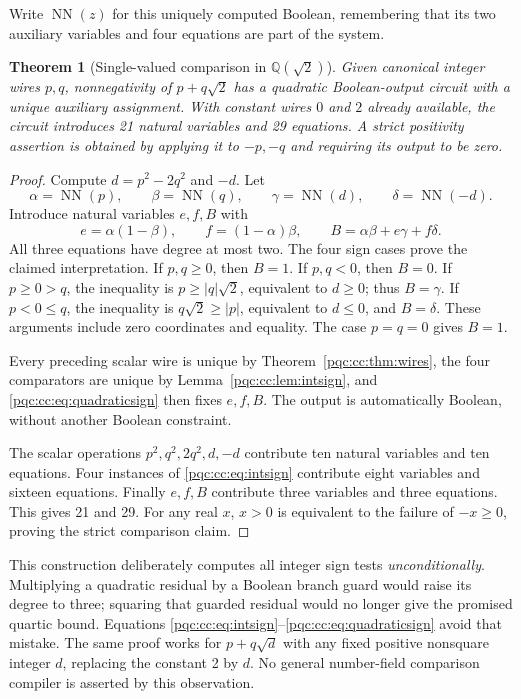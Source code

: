 \documentclass[11pt,letterpaper]{article}
\numberwithin{equation}{section}
\newtheorem{theorem}{Theorem}[section]
\theoremstyle{definition}
\theoremstyle{remark}
\newcommand{\Q}{\mathbb Q}
\newcommand{\NN}{\operatorname{NN}}
\begin{document}
Write $\NN(z)$ for this uniquely computed Boolean, remembering that its two
auxiliary variables and four equations are part of the system.

\begin{theorem}[Single-valued comparison in $\Q(\sqrt2)$]
\label{pqc:cc:thm:sqrt2sign}
Given canonical integer wires $p,q$, nonnegativity of $p+q\sqrt2$ has a
quadratic Boolean-output circuit with a unique auxiliary assignment. With
constant wires $0$ and $2$ already available, the circuit introduces 21 natural
variables and 29 equations. A strict positivity assertion is obtained by
applying it to $-p,-q$ and requiring its output to be zero.
\end{theorem}
\begin{proof}
Compute $d=p^2-2q^2$ and $-d$. Let
\[
 \alpha=\NN(p),\qquad \beta=\NN(q),\qquad
 \gamma=\NN(d),\qquad \delta=\NN(-d).
\]
Introduce natural variables $e,f,B$ with
\begin{equation}
 e=\alpha(1-\beta),\qquad f=(1-\alpha)\beta,\qquad
 B=\alpha\beta+e\gamma+f\delta.
\label{pqc:cc:eq:quadraticsign}
\end{equation}
All three equations have degree at most two. The four sign cases prove the
claimed interpretation. If $p,q\ge0$, then $B=1$. If $p,q<0$, then $B=0$.
If $p\ge0>q$, the inequality is $p\ge |q|\sqrt2$, equivalent to $d\ge0$;
thus $B=\gamma$. If $p<0\le q$, the inequality is $q\sqrt2\ge|p|$,
equivalent to $d\le0$, and $B=\delta$. These arguments include zero
coordinates and equality. The case $p=q=0$ gives $B=1$.

Every preceding scalar wire is unique by Theorem~\ref{pqc:cc:thm:wires}, the four
comparators are unique by Lemma~\ref{pqc:cc:lem:intsign}, and \eqref{pqc:cc:eq:quadraticsign}
then fixes $e,f,B$. The output is automatically Boolean, without another
Boolean constraint.

The scalar operations $p^2,q^2,2q^2,d,-d$ contribute ten natural variables and
ten equations. Four instances of \eqref{pqc:cc:eq:intsign} contribute eight variables
and sixteen equations. Finally $e,f,B$ contribute three variables and three
equations. This gives 21 and 29. For any real $x$, $x>0$ is equivalent to the
failure of $-x\ge0$, proving the strict comparison claim.
\end{proof}

This construction deliberately computes all integer sign tests
\emph{unconditionally}. Multiplying a quadratic residual by a Boolean branch
guard would raise its degree to three; squaring that guarded residual would
no longer give the promised quartic bound. Equations
\eqref{pqc:cc:eq:intsign}--\eqref{pqc:cc:eq:quadraticsign} avoid that mistake.
The same proof works for $p+q\sqrt d$ with any fixed positive nonsquare integer
$d$, replacing the constant 2 by $d$. No general number-field comparison
compiler is asserted by this observation.
\end{document}
